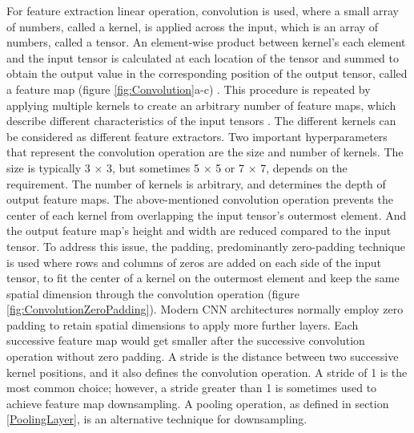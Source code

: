For feature extraction linear operation, convolution is used, where a small array of numbers, called a kernel, is applied across the input, which is an array of numbers, called a tensor. An element-wise product between kernel's each element and the input tensor is calculated at each location of the tensor and summed to obtain the output value in the corresponding position of the output tensor, called a feature map (figure \ref{fig:Convolution}a-c) \cite{articleCNNs}. 
This procedure is repeated by applying multiple kernels to create an arbitrary number of feature maps, which describe different characteristics of the input tensors \cite{articleCNNs}. The different kernels can be considered as different feature extractors. Two important hyperparameters that represent the convolution operation are the size and number of kernels. The size is typically 3 × 3, but sometimes 5 × 5 or 7 × 7, depends on the requirement. The number of kernels is arbitrary, and determines the depth of output feature maps. The above-mentioned convolution operation prevents the center of each kernel from overlapping the input tensor's outermost element. And the output feature map's height and width are reduced compared to the input tensor. To address this issue, the padding, predominantly zero-padding technique is used where rows and columns of zeros are added on each side of the input tensor, to fit the center of a kernel on the outermost element and keep the same spatial dimension through the convolution operation (figure \ref{fig:ConvolutionZeroPadding}). Modern \ac{CNN} architectures normally employ zero padding to retain spatial dimensions to apply more further layers. Each successive feature map would get smaller after the successive convolution operation without zero padding. A stride is the distance between two successive kernel positions, and it also defines the convolution operation. A stride of 1 is the most common choice; however, a stride greater than 1 is sometimes used to achieve feature map downsampling. A pooling operation, as defined in section \ref{PoolingLayer}, is an alternative technique for downsampling. 



